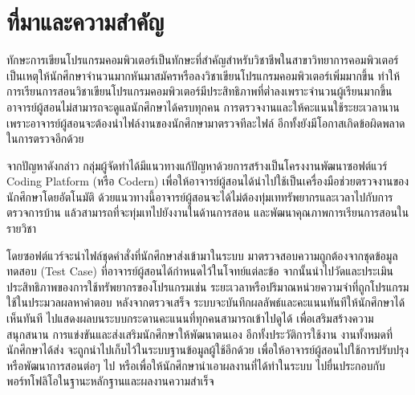 \documentclass[12pt,oneside,openright,a4paper]{cpe-thai-project}
\begin{document}
\section{ที่มาและความสำคัญ}

    \begin{flushleft}
    ทักษะการเขียนโปรแกรมคอมพิวเตอร์เป็นทักษะที่สำคัญสำหรับวิชาชีพในสาขาวิทยาการคอมพิวเตอร์ เป็นเหตุให้นักศึกษาจำนวนมากหันมาสมัครหรือลงวิชาเขียนโปรแกรมคอมพิวเตอร์เพิ่มมากขึ้น ทำให้การเรียนการสอนวิชาเขียนโปรแกรมคอมพิวเตอร์มีประสิทธิภาพที่ต่ำลงเพราะจำนวนผู้เรียนมากขึ้น อาจารย์ผู้สอนไม่สามารถจะดูแลนักศึกษาได้ครบทุกคน การตรวจงานและให้คะแนนใช้ระยะเวลานาน เพราะอาจารย์ผู้สอนจะต้องนำไฟล์งานของนักศึกษามาตรวจทีละไฟล์ อีกทั้งยังมีโอกาสเกิดข้อผิดพลาดในการตรวจอีกด้วย
    \end{flushleft}
    \begin{flushleft}
    จากปัญหาดังกล่าว กลุ่มผู้จัดทำได้มีแนวทางแก้ปัญหาด้วยการสร้างเป็นโครงงานพัฒนาซอฟต์แวร์ Coding Platform (หรือ Codern) เพื่อให้อาจารย์ผู้สอนได้นำไปใช้เป็นเครื่องมือช่วยตรวจงานของนักศึกษาโดยอัตโนมัติ ด้วยแนวทางนี้อาจารย์ผู้สอนจะได้ไม่ต้องทุ่มเททรัพยากรและเวลาไปกับการตรวจการบ้าน แล้วสามารถที่จะทุ่มเทไปยังงานในด้านการสอน และพัฒนาคุณภาพการเรียนการสอนในรายวิชา
    \end{flushleft}
    \begin{flushleft}
    โดยซอฟต์แวร์จะนำไฟล์ชุดคำสั่งที่นักศึกษาส่งเข้ามาในระบบ มาตรวจสอบความถูกต้องจากชุดข้อมูลทดสอบ (Test Case) ที่อาจารย์ผู้สอนได้กำหนดไว้ในโจทย์แต่ละข้อ จากนั้นนำไปวัดและประเมินประสิทธิภาพของการใช้ทรัพยากรของโปรแกรมเช่น ระยะเวลาหรือปริมาณหน่วยความจำที่ถูกโปรแกรมใช้ในประมวลผลหาคำตอบ หลังจากตรวจเสร็จ ระบบจะบันทึกผลลัพธ์และคะแนนทันทีให้นักศึกษาได้เห็นทันที ไปแสดงผลบนระบบกระดานคะแนนที่ทุกคนสามารถเข้าไปดูได้ เพื่อเสริมสร้างความสนุกสนาน การแข่งขันและส่งเสริมนักศึกษาให้พัฒนาตนเอง อีกทั้งประวัติการใช้งาน งานทั้งหมดที่นักศึกษาได้ส่ง จะถูกนำไปเก็บไว้ในระบบฐานข้อมูลผู้ใช้อีกด้วย เพื่อให้อาจารย์ผู้สอนไปใช้การปรับปรุงหรือพัฒนาการสอนต่อๆ ไป หรือเพื่อให้นักศึกษานำเอาผลงานที่ได้ทำในระบบ ไปยื่นประกอบกับพอร์ทโฟลิโอในฐานะหลักฐานและผลงานความสำเร็จ
    \end{flushleft}
\end{document}

